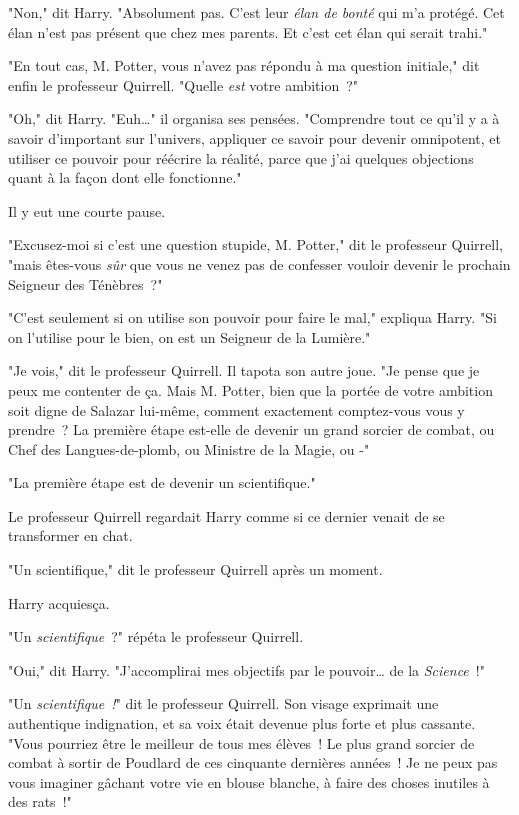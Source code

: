 "Non," dit Harry. "Absolument pas. C'est leur \emph{élan de bonté} qui m'a protégé. Cet élan n'est pas présent que chez mes parents. Et c'est cet élan qui serait trahi."

"En tout cas, M. Potter, vous n'avez pas répondu à ma question initiale," dit enfin le professeur Quirrell. "Quelle \emph{est} votre ambition~?"

"Oh," dit Harry. "Euh…" il organisa ses pensées. "Comprendre tout ce qu'il y a à savoir d'important sur l'univers, appliquer ce savoir pour devenir omnipotent, et utiliser ce pouvoir pour réécrire la réalité, parce que j'ai quelques objections quant à la façon dont elle fonctionne."

Il y eut une courte pause.

"Excusez-moi si c'est une question stupide, M. Potter," dit le professeur Quirrell, "mais êtes-vous \emph{sûr} que vous ne venez pas de confesser vouloir devenir le prochain Seigneur des Ténèbres~?"

"C'est seulement si on utilise son pouvoir pour faire le mal," expliqua Harry. "Si on l'utilise pour le bien, on est un Seigneur de la Lumière."

"Je vois," dit le professeur Quirrell. Il tapota son autre joue. "Je pense que je peux me contenter de ça. Mais M. Potter, bien que la portée de votre ambition soit digne de Salazar lui-même, comment exactement comptez-vous vous y prendre~? La première étape est-elle de devenir un grand sorcier de combat, ou Chef des Langues-de-plomb, ou Ministre de la Magie, ou -"

"La première étape est de devenir un scientifique."

Le professeur Quirrell regardait Harry comme si ce dernier venait de se transformer en chat.

"Un scientifique," dit le professeur Quirrell après un moment.

Harry acquiesça.

"Un \emph{scientifique}~?" répéta le professeur Quirrell.

"Oui," dit Harry. "J'accomplirai mes objectifs par le pouvoir… de la \emph{Science}~!"

"Un \emph{scientifique~!}" dit le professeur Quirrell. Son visage exprimait une authentique indignation, et sa voix était devenue plus forte et plus cassante. "Vous pourriez être le meilleur de tous mes élèves~! Le plus grand sorcier de combat à sortir de Poudlard de ces cinquante dernières années~! Je ne peux pas vous imaginer gâchant votre vie en blouse blanche, à faire des choses inutiles à des rats~!"

